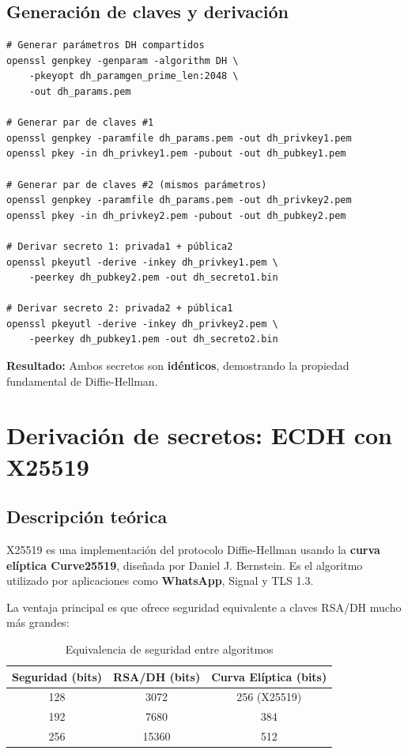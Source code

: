 \subsection{Generación de claves y derivación}

\begin{lstlisting}[caption=Derivación de secretos DH]
# Generar parámetros DH compartidos
openssl genpkey -genparam -algorithm DH \
    -pkeyopt dh_paramgen_prime_len:2048 \
    -out dh_params.pem

# Generar par de claves #1
openssl genpkey -paramfile dh_params.pem -out dh_privkey1.pem
openssl pkey -in dh_privkey1.pem -pubout -out dh_pubkey1.pem

# Generar par de claves #2 (mismos parámetros)
openssl genpkey -paramfile dh_params.pem -out dh_privkey2.pem
openssl pkey -in dh_privkey2.pem -pubout -out dh_pubkey2.pem

# Derivar secreto 1: privada1 + pública2
openssl pkeyutl -derive -inkey dh_privkey1.pem \
    -peerkey dh_pubkey2.pem -out dh_secreto1.bin

# Derivar secreto 2: privada2 + pública1
openssl pkeyutl -derive -inkey dh_privkey2.pem \
    -peerkey dh_pubkey1.pem -out dh_secreto2.bin
\end{lstlisting}

\textbf{Resultado:} Ambos secretos son \textbf{idénticos}, demostrando la propiedad fundamental de Diffie-Hellman.


\section{Derivación de secretos: ECDH con X25519}

\subsection{Descripción teórica}

X25519 es una implementación del protocolo Diffie-Hellman usando la \textbf{curva elíptica Curve25519}, diseñada por Daniel J. Bernstein. Es el algoritmo utilizado por aplicaciones como \textbf{WhatsApp}, Signal y TLS 1.3.

La ventaja principal es que ofrece seguridad equivalente a claves RSA/DH mucho más grandes:

\begin{table}[H]
    \centering
    \caption{Equivalencia de seguridad entre algoritmos}
    \begin{tabularx}{\textwidth}{c|c|c}
        \toprule
        \textbf{Seguridad (bits)} & \textbf{RSA/DH (bits)} & \textbf{Curva Elíptica (bits)} \\
        \midrule
        128 & 3072 & 256 (X25519) \\
        192 & 7680 & 384 \\
        256 & 15360 & 512 \\
        \bottomrule
    \end{tabularx}
\end{table}


